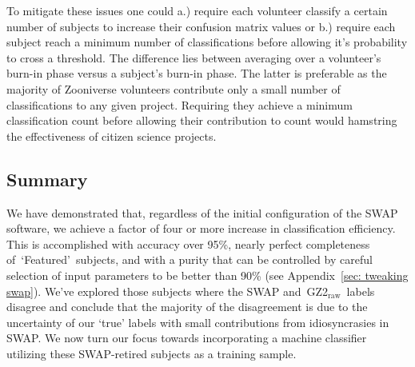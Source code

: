 \documentclass[twocolumn]{aastex6}
\newcommand{\Pf}{$P_{F,0}$}
\newcommand{\feat}{`Featured'}
\newcommand{\notfeat}{`Not'}
\newcommand{\raw}{GZ2$_{\text{raw}}$}
\begin{document}



To mitigate these issues one could a.) require each volunteer classify a certain 
number of subjects to increase their confusion matrix values or
b.) require each subject reach a minimum number of classifications before allowing 
it's probability to cross a threshold. The difference lies between averaging over a 
volunteer's burn-in phase versus a subject's burn-in phase.
The latter is preferable as the majority of Zooniverse volunteers contribute only 
a small number of classifications to any given project. Requiring they achieve a 
minimum classification count before allowing their contribution to count would 
hamstring the effectiveness of citizen science projects. 


\subsection{Summary}

We have demonstrated that, regardless of the initial configuration of the SWAP 
software, we achieve a factor of four or more increase in classification efficiency. 
This is accomplished with accuracy over 95\%, nearly perfect completeness 
of~\feat~subjects, and with a purity that can be controlled by careful selection of 
input parameters to be better than 90\% (see Appendix~\ref{sec: tweaking swap}).
We've explored those subjects where the SWAP and~\raw~labels disagree
and conclude that the majority of the disagreement is due to the uncertainty of 
our `true' labels with small contributions from idiosyncrasies in SWAP. 
We now turn our focus towards incorporating a machine
classifier utilizing these SWAP-retired subjects as a training sample. 
\end{document}
